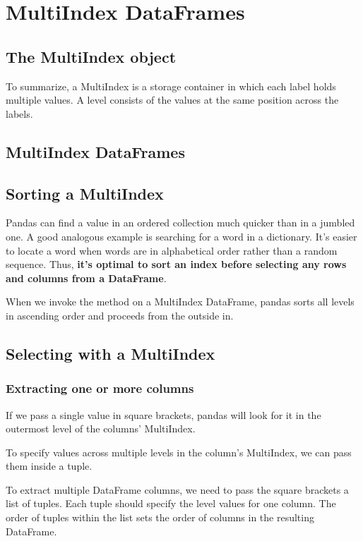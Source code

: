 \chapter{MultiIndex DataFrames\label{Ch07}}
\section{The MultiIndex object}
To summarize, a MultiIndex is a storage container in which each label holds multiple values. A level consists of the values at the same position across the labels.

\section{MultiIndex DataFrames}

\section{Sorting a MultiIndex}
Pandas can find a value in an ordered collection much quicker than in a jumbled one. A good analogous example is searching for a word in a dictionary. It's easier to locate a word when words are in alphabetical order rather than a random sequence. Thus, \textbf{it's optimal to sort an index before selecting any rows and columns from a DataFrame}.

When we invoke the method on a MultiIndex DataFrame, pandas sorts all levels in ascending order and proceeds from the outside in.
\section{Selecting with a MultiIndex}
\subsection{Extracting one or more columns}
If we pass a single value in square brackets, pandas will look for it in the outermost level of the columns' MultiIndex.

To specify values across multiple levels in the column's MultiIndex, we can pass them inside a tuple.

To extract multiple DataFrame columns, we need to pass the square brackets a list of tuples. Each tuple should specify the level values for one column. The order of tuples within the list sets the order of columns in the resulting DataFrame.
\section{}
\section{}